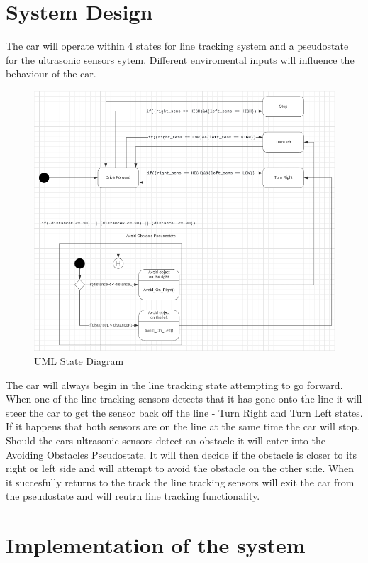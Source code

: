 \documentclass[conference]{IEEEtran}
\begin{document}
\section{System Design}
The car will operate within 4 states for line tracking system and a pseudostate for the ultrasonic sensors sytem. Different enviromental inputs will influence the behaviour of the car.
\begin{figure}[h!]
	\includegraphics[width=\linewidth]{UMLStateDiagram.png}
	\caption{UML State Diagram}
	\label{fig:UMLSD1}
\end{figure}

The car will always begin in the line tracking state attempting to go forward. When one of the line tracking sensors detects that it has gone onto the line it will steer the car to get the sensor back off the line - Turn Right and Turn Left states. If it happens that both sensors are on the line at the same time the car will stop. Should the cars ultrasonic sensors detect an obstacle it will enter into the Avoiding Obstacles Pseudostate. It will then decide if the obstacle is closer to its right or left side and will attempt to avoid the obstacle on the other side. When it succesfully returns to the track the line tracking sensors will exit the car from the pseudostate and will reutrn line tracking functionality.

\section{Implementation of the system}
\end{document}
